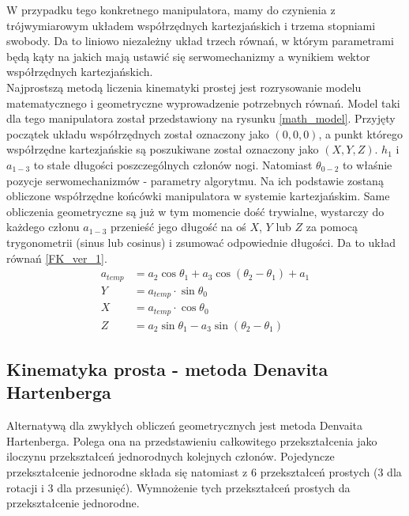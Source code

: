 W przypadku tego konkretnego manipulatora, mamy do czynienia z trójwymiarowym układem współrzędnych kartezjańskich i trzema stopniami swobody. Da to liniowo niezależny układ trzech równań, w którym parametrami będą kąty na jakich mają ustawić się serwomechanizmy a wynikiem wektor współrzędnych kartezjańskich.\\

Najprostszą metodą liczenia kinematyki prostej jest rozrysowanie modelu matematycznego i geometryczne wyprowadzenie potrzebnych równań. Model taki dla tego manipulatora został przedstawiony na rysunku \ref{math_model}. Przyjęty początek układu współrzędnych został oznaczony jako $(0, 0, 0)$, a punkt którego współrzędne kartezjańskie są poszukiwane został oznaczony jako $(X, Y, Z)$. $h_1$ i $a_{1-3}$ to stałe długości poszczególnych członów nogi. Natomiast $\theta_{0-2}$ to właśnie pozycje serwomechanizmów - parametry algorytmu. Na ich podstawie zostaną obliczone współrzędne końcówki manipulatora w systemie kartezjańskim. Same obliczenia geometryczne są już w tym momencie dość trywialne, wystarczy do każdego członu $a_{1-3}$ przenieść jego długość na oś $X$, $Y$ lub $Z$ za pomocą trygonometrii (sinus lub cosinus) i zsumować odpowiednie długości. Da to układ równań \ref{FK_ver_1}.\\

\begin{equation} \label{FK_ver_1}
\begin{split}
a_{temp} &= a_2 \cos{\theta_1} + a_3 \cos{\left(\theta_2 - \theta_1\right)} + a_1\\
Y &= a_{temp} \cdot \sin{\theta_0}\\
X &= a_{temp} \cdot \cos{\theta_0}\\
Z &= a_2 \sin{\theta_1} - a_3 \sin{\left(\theta_2 - \theta_1\right)}
\end{split}
\end{equation}

\subsection{Kinematyka prosta - metoda Denavita Hartenberga \cite{DH_AA_article}}
Alternatywą dla zwykłych obliczeń geometrycznych jest metoda Denvaita Hartenberga. Polega ona na przedstawieniu całkowitego przekształcenia jako iloczynu przekształceń jednorodnych kolejnych członów. Pojedyncze przekształcenie jednorodne składa się natomiast z 6 przekształceń prostych (3 dla rotacji i 3 dla przesunięć). Wymnożenie tych przekształceń prostych da przekształcenie jednorodne. \cite{DH_wpaszke_wyklad}\\

